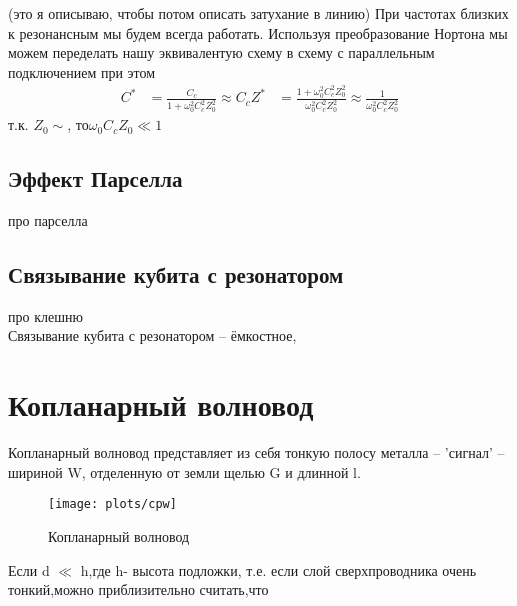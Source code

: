 \documentclass[12pt, twoside]{report}
\begin{document}
(это я описываю, чтобы потом описать затухание в линию)
 При частотах близких к резонансным мы будем всегда работать. Используя преобразование Нортона\cite{Goppl2008} мы можем переделать нашу эквивалентую схему в схему с параллельным подключением
при этом  
	\begin{align}
	C^*&=\frac{C_c}{1+\omega_0^2 C_c^2 Z_0^2} \approx C_c
	Z^*&=\frac{1+\omega_0^2 C_c^2 Z_0^2}{\omega_0^2 C_c^2 Z_0^2} \approx \frac{1}{\omega_0^2 C_c^2 Z_0^2} 
	\end{align}
т.к. $Z_0\sim$, то$\omega_0 C_c Z_0 \ll 1$
	\subsection{Эффект Парселла}
про парселла\cite{Koch2007}	
	\subsection{Связывание кубита с резонатором}
про клешню\cite{Sank2014}\\
Связывание кубита с резонатором -- ёмкостное,	

\newpage
	\section{Копланарный волновод}%
Копланарный волновод представляет из себя тонкую полосу металла -- 'сигнал' -- шириной W, отделенную от земли щелью G и длинной l.
	\begin{figure}[h]
		\begin{center}
\texttt{[image: plots/cpw]}
\caption{Копланарный волновод}
		\end{center}
	\end{figure}
Если d $\ll$ h,где h- высота подложки, т.е. если слой сверхпроводника очень тонкий,можно приблизительно считать,что\cite{Goppl2008}
	
\end{document}
